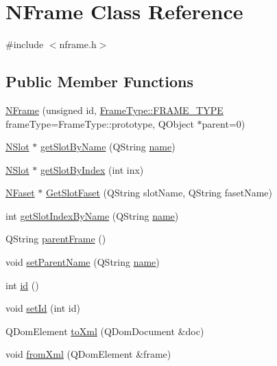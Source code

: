 \hypertarget{class_n_frame}{
\section{NFrame Class Reference}
\label{class_n_frame}
}


{\ttfamily \#include $<$nframe.h$>$}

\subsection*{Public Member Functions}
\begin{DoxyCompactItemize}
\item 
\hyperlink{class_n_frame_ac3c835e0a93cd9eb613bb1ba71141851}{NFrame} (unsigned id, \hyperlink{namespace_frame_type_aa380b02be71bbce421af299f6025b6a4}{FrameType::FRAME\_\-TYPE} frameType=FrameType::prototype, QObject $\ast$parent=0)
\item 
\hyperlink{class_n_slot}{NSlot} $\ast$ \hyperlink{class_n_frame_abe3074d65afcaec388b1a0b744b50683}{getSlotByName} (QString \hyperlink{class_n_frame_aa88316dc74552f3997001ec6a67038e9}{name})
\item 
\hyperlink{class_n_slot}{NSlot} $\ast$ \hyperlink{class_n_frame_afda53d42e1e4711b2088ff8251cb9c79}{getSlotByIndex} (int inx)
\item 
\hyperlink{class_n_faset}{NFaset} $\ast$ \hyperlink{class_n_frame_a0605dc85591504abd0319eb523e3985a}{GetSlotFaset} (QString slotName, QString fasetName)
\item 
int \hyperlink{class_n_frame_a6388f6038d3cae3a0a9782abedb756e6}{getSlotIndexByName} (QString \hyperlink{class_n_frame_aa88316dc74552f3997001ec6a67038e9}{name})
\item 
QString \hyperlink{class_n_frame_a48800a80b1f3216e882a65cd9a05d479}{parentFrame} ()
\item 
void \hyperlink{class_n_frame_a927e13c4a5847866615307cf1fa1b99e}{setParentName} (QString \hyperlink{class_n_frame_aa88316dc74552f3997001ec6a67038e9}{name})
\item 
int \hyperlink{class_n_frame_a43fc64256869fb840f532b7b84c443c6}{id} ()
\item 
void \hyperlink{class_n_frame_ab4ca6d96ae1c3718feb811bf349393ce}{setId} (int id)
\item 
QDomElement \hyperlink{class_n_frame_a3020ad29368b8b45949fbf82b9891d7d}{toXml} (QDomDocument \&doc)
\item 
void \hyperlink{class_n_frame_ae669f7c479bf7268b8356fbf4dd5577c}{fromXml} (QDomElement \&frame)

\end{DoxyCompactItemize}
